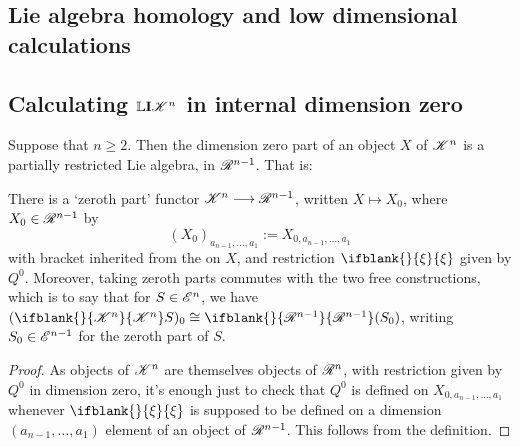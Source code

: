 \documentclass[11pt]{article}
\newcommand{\GS}[1]{\scrE^{#1}}
\newcommand{\PRLie}[1]{\scrR^{#1}}%
\newcommand{\LL}[1]{{\scrK}^{#1}}%
\newcommand{\Ind}[2][]{\mathbf{I}{#2}_{#1}}%
\newcommand{\Fr}[2][]{\ifblank{#1}{#2}{#2_{#1}}}
\newcommand{\restn}[2][]{\ifblank{#1}{\xi{#2}}{\xi_{#1}{#2}}}%
\newcommand{\derived}{\mathbb{L}}
\renewcommand{\Q}{Q}
\begin{document}
\begin{DerivedFunctorsLowDimension}
\section{Lie algebra homology and low dimensional calculations}
\subsection{Calculating $\derived\Ind{\LL{n}}$ in internal dimension zero}
Suppose that $n\geq2$. Then the dimension zero part of an object $X$ of $\LL{n}$ is a partially restricted Lie algebra, in $\PRLie{n-1}$. That is: 
\begin{lem*}
There is a `zeroth part' functor $\LL{n}\to\PRLie{n-1}$, written $X\mapsto X_0$, where $X_0\in\PRLie{n-1}$ by
\[(X_0)_{a_{n-1},\ldots,a_1}:=X_{0,a_{n-1},\ldots,a_1}\]
with bracket inherited from the on $X$, and restriction $\restn{}$ given by $\Q^0$. Moreover, taking zeroth parts commutes with the two free constructions, which is to say that for $S\in\GS{n}$, we have $(\Fr{\LL{n}}S)_0\cong\Fr{\PRLie{n-1}}(S_0)$, writing $S_0\in\GS{n-1}$ for the zeroth part of $S$.
\end{lem*}
\begin{proof}
As objects of $\LL{n}$ are themselves objects of $\PRLie{n}$, with restriction given by $\Q^0$ in dimension zero, it's enough just to check that $\Q^0$ is defined on $X_{0,a_{n-1},\ldots,a_1}$ whenever $\restn{}$ is supposed to be defined on a dimension $(a_{n-1},\ldots,a_1)$ element of an object of $\PRLie{n-1}$. This follows from the definition.


\end{proof}
\end{DerivedFunctorsLowDimension}
\end{document}
